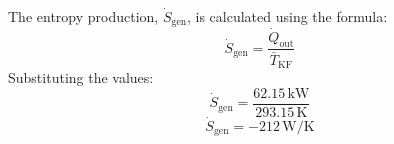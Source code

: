 The entropy production, \( \dot{S}_{\text{gen}} \), is calculated using the formula:  
\[
\dot{S}_{\text{gen}} = \frac{\dot{Q}_{\text{out}}}{\bar{T}_{\text{KF}}}
\]  
Substituting the values:  
\[
\dot{S}_{\text{gen}} = \frac{62.15 \, \text{kW}}{293.15 \, \text{K}}
\]  
\[
\dot{S}_{\text{gen}} = -212 \, \text{W/K}
\]